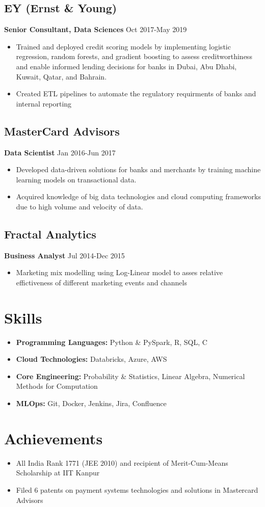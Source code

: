 \documentclass[a4paper,10pt]{article}
\begin{document}
\subsection*{EY (Ernst \& Young)}
\textbf{Senior Consultant, Data Sciences} \hfill Oct 2017-May 2019
\begin{itemize}[leftmargin=*]
    \item  Trained and deployed credit scoring models by implementing logistic regression, random forests, and gradient boosting to assess creditworthiness and enable informed lending decisions for banks in Dubai, Abu Dhabi, Kuwait, Qatar, and Bahrain.
    \item Created ETL pipelines to automate the regulatory requirments of banks and internal reporting 
\end{itemize}

\subsection*{MasterCard Advisors}
\textbf{Data Scientist} \hfill Jan 2016-Jun 2017
\begin{itemize}[leftmargin=*]
    \item Developed data-driven solutions for banks and merchants by training machine learning models on transactional data.
    \item Acquired knowledge of big data technologies and cloud computing frameworks due to high volume and velocity of data.
\end{itemize}

\subsection*{Fractal Analytics}
\textbf{Business Analyst} \hfill Jul 2014-Dec 2015
\begin{itemize}[leftmargin=*]
    \item Marketing mix modelling using Log-Linear model to asses relative effictiveness of different marketing events and channels  
\end{itemize}

\section*{Skills}
\begin{itemize}[leftmargin=*]
    \item \textbf{Programming Languages:} Python \& PySpark, R, SQL, C
    \item \textbf{Cloud Technologies:} Databricks, Azure, AWS
    \item \textbf{Core Engineering:} Probability \& Statistics, Linear Algebra, Numerical Methods for Computation
    \item \textbf{MLOps:} Git, Docker, Jenkins, Jira, Confluence
\end{itemize}

\section*{Achievements}
\begin{itemize}[leftmargin=*]
    \item All India Rank 1771 (JEE 2010) and recipient of Merit-Cum-Means Scholarship at IIT Kanpur
    \item Filed 6 patents on payment systems technologies and solutions in Mastercard Advisors
\end{itemize}
\end{document}
